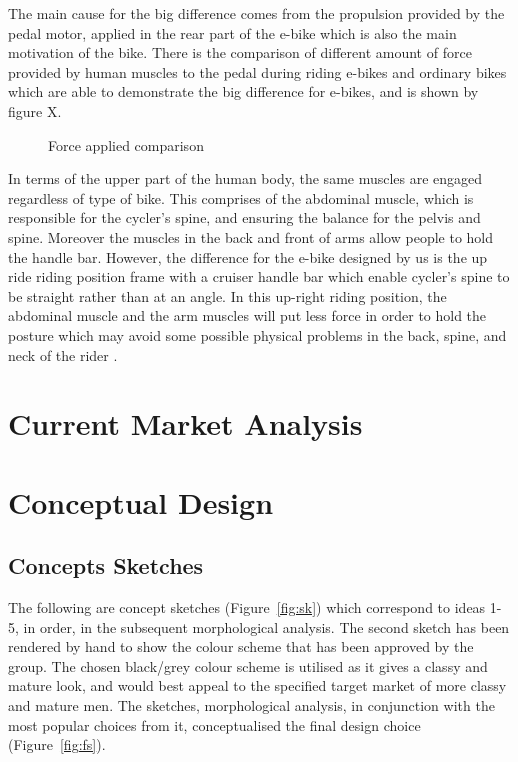 \documentclass[a4paper,11pt]{article}
\begin{document}
The main cause for the big difference comes from the propulsion provided by the pedal motor, applied in the rear part of the e-bike which is also the main motivation of the bike. There is the comparison of different amount of force provided by human muscles to the pedal during riding e-bikes and ordinary bikes which are able to demonstrate the big difference for e-bikes, and is shown by figure X. 

\begin{figure}[ht]
	\caption{Force applied comparison}
\end{figure}

In terms of the upper part of the human body, the same muscles are engaged regardless of type of bike. This comprises of the abdominal muscle, which is responsible for the cycler's spine, and ensuring the balance for the pelvis and spine. Moreover the muscles in the back and front of arms allow people to hold the handle bar. However, the difference for the e-bike designed by us is the up ride riding position frame with a cruiser handle bar which enable cycler's spine to be straight rather than at an angle. In this up-right riding position, the abdominal muscle and the arm muscles will put less force in order to hold the posture which may avoid some possible physical problems in the back, spine, and neck of the rider \cite{schwell05}.

\section{Current Market Analysis}

\section{Conceptual Design}

\subsection{Concepts Sketches}

The following are concept sketches (Figure~\ref{fig:sk}) which correspond to ideas 1-5, in order, in the subsequent morphological analysis. The second sketch has been rendered by hand to show the colour scheme that has been approved by the group. The chosen black/grey colour scheme is utilised as it gives a classy and mature look, and would best appeal to the specified target market of more classy and mature men. The sketches, morphological analysis, in conjunction with the most popular choices from it, conceptualised the final design choice (Figure~\ref{fig:fs}). 
\end{document}
